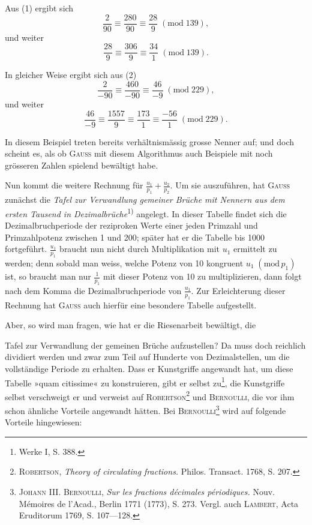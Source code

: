 \endgroup
\par\noindent\hspace*{\parindent}Aus (1) ergibt sich
\[
\frac{2}{90}\equiv\frac{280}{90}\equiv\frac{28}{9}\;(\mathrm{mod}\;139),
\]
\noindent und weiter
\[
\frac{28}{9}\equiv\frac{306}{9}\equiv\frac{34}{1}\;(\mathrm{mod}\;139).
\]
\par\noindent\hspace*{\parindent}In gleicher Weise ergibt sich aus (2)
\[
\frac{2}{-90}\equiv\frac{460}{-90}\equiv\frac{46}{-9}\;(\mathrm{mod}\;229),
\]
\noindent und weiter
\[
\frac{46}{-9}\equiv\frac{1557}{9}\equiv\frac{173}{1}\equiv\frac{-56}{1}\;(\mathrm{mod}\;229).
\]
\par\noindent\hspace*{\parindent}In diesem Beispiel treten bereits verhältnismässig grosse Nenner auf; und
doch scheint es, als ob \textsc{Gauss} mit diesem Algorithmus auch Beispiele mit
noch grösseren Zahlen spielend bewältigt habe.

Nun kommt die weitere Rechnung für $\frac{u_1}{p_1}+\frac{u_2}{p_2}$. Um sie auszuführen, hat
\textsc{Gauss} zunächst die \textit{Tafel zur Verwandlung gemeiner Brüche mit Nennern aus
dem ersten Tausend in Dezimalbrüche}\textsuperscript{1)} angelegt. In dieser Tabelle findet sich
die Dezimalbruchperiode der reziproken Werte einer jeden Primzahl und
Primzahlpotenz zwischen 1 und 200; später hat er die Tabelle bis 1000 fortgeführt. $\frac{u_1}{p_1}$ braucht nun nicht durch Multiplikation mit $u_1$ ermittelt zu
werden; denn sobald man weiss, welche Potenz von 10 kongruent $u_1\;(\mathrm{mod}\,p_1)$
ist, so braucht man nur $\frac{1}{p_1}$ mit dieser Potenz von 10 zu multiplizieren, dann
folgt nach dem Komma die Dezimalbruchperiode von $\frac{u_1}{p_1}$. Zur Erleichterung
dieser Rechnung hat \textsc{Gauss} auch hierfür eine besondere Tabelle aufgestellt.
\setcounter{footnote}{2}

Aber, so wird man fragen, wie hat er die Riesenarbeit bewältigt, die
\par\clearpage{}
\setcounter{footnote}{0}
\noindent Tafel zur Verwandlung der gemeinen Brüche aufzustellen? Da muss doch
reichlich dividiert werden und zwar zum Teil auf Hunderte von Dezimalstellen, um die vollständige Periode zu erhalten. Dass er Kunstgriffe angewandt hat, um diese Tabelle »quam citissime« zu konstruieren, gibt er selbst
zu\footnote{Werke I, S. 388.}, die Kunstgriffe selbst verschweigt er und verweist auf \textsc{Robertson}\footnote{\textsc{Robertson}, \textit{Theory of circulating fractions.} Philos. Transact. 1768, S. 207.} und
\textsc{Bernoulli}, die vor ihm schon ähnliche Vorteile angewandt hätten. Bei \textsc{Bernoulli}\footnote{\textsc{Johann III. Bernoulli}, \textit{Sur les fractions décimales périodiques.} Nouv. Mémoires de l’Acad., Berlin 1771 (1773), S. 273. Vergl. auch \textsc{Lambert}, Acta Eruditorum 1769, S. 107—128.} wird auf folgende Vorteile hingewiesen:

